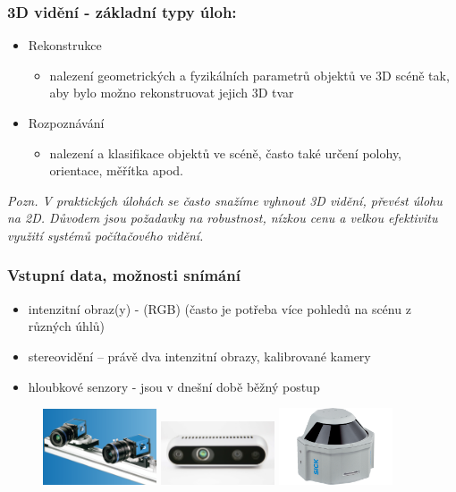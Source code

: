 \begin{frame}
\frametitle{3D vidění - základní typy úloh:}
\begin{itemize}
	\item Rekonstrukce
    \begin{itemize}
    \item nalezení  geometrických  a  fyzikálních  parametrů  objektů  ve  3D scéně  tak,  aby  bylo  možno rekonstruovat jejich 3D tvar
    \end{itemize}
    \item Rozpoznávání
    \begin{itemize}
    \item nalezení a klasifikace objektů ve scéně, často také určení polohy, orientace, měřítka apod.
    \end{itemize}
\end{itemize}
\textit{Pozn. V praktických úlohách se často snažíme vyhnout 3D vidění, převést úlohu na 2D. Důvodem jsou požadavky na robustnost, nízkou cenu a velkou efektivitu využití systémů počítačového vidění.}
\end{frame}

\begin{frame}
\frametitle{Vstupní data, možnosti snímání}
\begin{itemize}
	\item intenzitní obraz(y) - (RGB) (často je potřeba více pohledů na scénu z různých úhlů)
	\item stereovidění – právě dva intenzitní obrazy, kalibrované kamery
	\item hloubkové senzory - jsou v dnešní době běžný postup 
\end{itemize}

    \begin{figure}[!ht]
	\centering
	\includegraphics[width = 0.3\textwidth]{./stereo}
	\includegraphics[width = 0.3\textwidth]{./intel}
	\includegraphics[width = 0.3\textwidth]{./lidar}
	\end{figure}
	
\end{frame}

